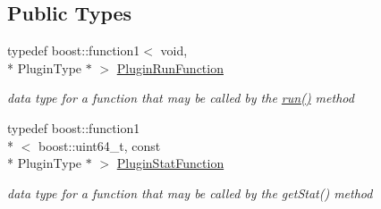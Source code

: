 \subsection*{Public Types}
\begin{DoxyCompactItemize}
\item 
typedef boost\-::function1$<$ void, \\*
Plugin\-Type $\ast$ $>$ \hyperlink{classpion_1_1plugin__manager_a275b88a2c9f7c89d6d737c1b444be8b2}{Plugin\-Run\-Function}
\begin{DoxyCompactList}\small\item\em data type for a function that may be called by the \hyperlink{classpion_1_1plugin__manager_a1c2f6105acfcfcf1b742aecab122a368}{run()} method \end{DoxyCompactList}\item 
typedef boost\-::function1\\*
$<$ boost\-::uint64\-\_\-t, const \\*
Plugin\-Type $\ast$ $>$ \hyperlink{classpion_1_1plugin__manager_a1e6a4223438c74e4e928401f734d2e0c}{Plugin\-Stat\-Function}
\begin{DoxyCompactList}\small\item\em data type for a function that may be called by the get\-Stat() method \end{DoxyCompactList}\end{DoxyCompactItemize}
